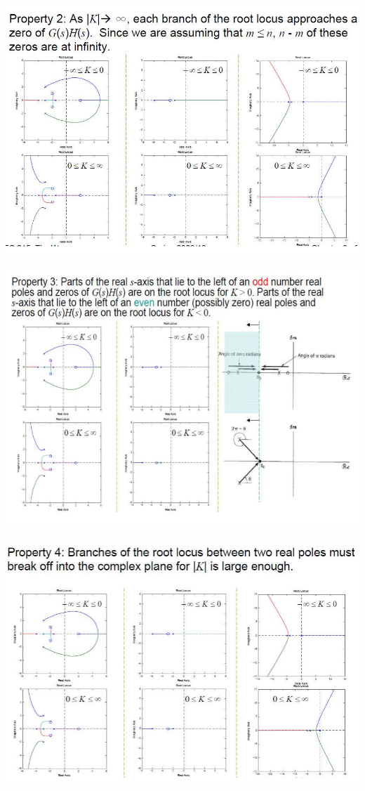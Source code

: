 \documentclass[landscape,a4paper]{article}
\begin{document}
\begin{multicols}{3}
\includegraphics[width=\linewidth]{11.6.png}

\includegraphics[width=\linewidth]{11.7.png}

\includegraphics[width=\linewidth]{11.8.png}


\end{multicols}
\end{document}
